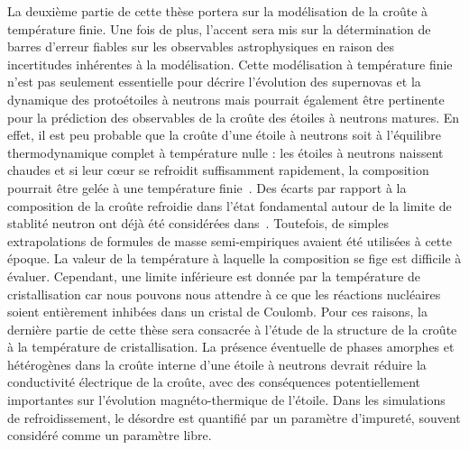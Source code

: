 La deuxième partie de cette thèse portera sur la modélisation de la croûte à 
température finie. Une fois de plus, l'accent sera mis sur la détermination 
de barres d'erreur fiables sur les observables astrophysiques en raison des 
incertitudes inhérentes à la modélisation. 
Cette modélisation à température finie n'est pas seulement essentielle pour 
décrire l'évolution des supernovas et la dynamique des protoétoiles à neutrons 
mais pourrait également être pertinente pour la prédiction des observables 
de la croûte des étoiles à neutrons matures. 
En effet, il est peu probable que la croûte d'une étoile à neutrons soit à 
l'équilibre thermodynamique complet à température nulle : les étoiles à
neutrons naissent chaudes et si leur c\oe ur se refroidit suffisamment 
rapidement, la composition pourrait être gelée à une température 
finie~\cite{Goriely2011}. 
Des écarts par rapport à la composition de la croûte refroidie dans l'état 
fondamental autour de la limite de stablité neutron ont déjà été considérées
dans~\cite{Bisnovaty1979}. Toutefois, de simples extrapolations de formules de
masse semi-empiriques avaient été utilisées à cette époque. 
La valeur de la température à laquelle la composition se fige est difficile 
à évaluer. Cependant, une limite inférieure est donnée par la température de 
cristallisation car nous pouvons nous attendre à ce que les réactions 
nucléaires soient entièrement inhibées dans un cristal de Coulomb. 
Pour ces raisons, la dernière partie de cette thèse sera consacrée à l'étude 
de la structure de la croûte à la température de cristallisation. 
La présence éventuelle de phases amorphes et hétérogènes dans la croûte 
interne d'une étoile à neutrons devrait réduire la conductivité électrique de 
la croûte, avec des conséquences potentiellement importantes sur l'évolution 
magnéto-thermique de l'étoile. Dans les simulations de refroidissement, le 
désordre est quantifié par un paramètre d'impureté, souvent considéré comme un 
paramètre libre. 
\\

